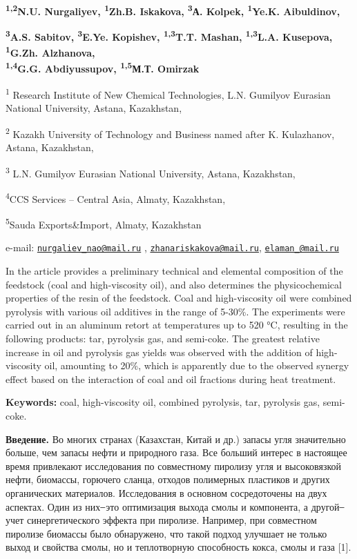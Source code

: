 {\bfseries \textsuperscript{1,2}N.U. Nurgaliyev\textsuperscript{\envelope },
\textsuperscript{1}Zh.B. Iskakova\textsuperscript{\envelope },
\textsuperscript{3}А. Kolpek, \textsuperscript{1}Ye.K.
Aibuldinov\textsuperscript{\envelope },}

{\bfseries \textsuperscript{3}A.S. Sabitov, \textsuperscript{3}E.Ye.
Kopishev, \textsuperscript{1,3}T.T. Mashan, \textsuperscript{1,3}L.A.
Kusepova, \textsuperscript{1}G.Zh. Alzhanova,\\
\textsuperscript{1,4}G.G. Abdiyussupov, \textsuperscript{1,5}М.Т.
Omirzak}

\textsuperscript{1} Research Institute of New Chemical Technologies,
L.N. Gumilyov Eurasian National University, Astana, Kazakhstan,

\textsuperscript{2} Kazakh University of Technology and Business named
after K. Kulazhanov, Astana, Kazakhstan,

\textsuperscript{3} L.N. Gumilyov Eurasian National University, Astana,
Kazakhstan,

\textsuperscript{4}CCS Services -- Central Asia, Almaty, Kazakhstan,

\textsuperscript{5}Sauda Exports\&Import, Almaty, Kazakhstan

e-mail:
\href{mailto:nurgaliev_nao@mail.ru}{\nolinkurl{nurgaliev\_nao@mail.ru}}
,
\href{mailto:zhanariskakova@mail.ru}{\nolinkurl{zhanariskakova@mail.ru}},
\href{mailto:elaman_@mail.ru}{\nolinkurl{elaman\_@mail.ru}}

In the article provides a preliminary technical and elemental
composition of the feedstock (coal and high-viscosity oil), and also
determines the physicochemical properties of the resin of the feedstock.
Coal and high-viscosity oil were combined pyrolysis with various oil
additives in the range of 5-30\%. The experiments were carried out in an
aluminum retort at temperatures up to 520 °C, resulting in the following
products: tar, pyrolysis gas, and semi-coke. The greatest relative
increase in oil and pyrolysis gas yields was observed with the addition
of high-viscosity oil, amounting to 20\%, which is apparently due to the
observed synergy effect based on the interaction of coal and oil
fractions during heat treatment.

{\bfseries Keywords:} coal, high-viscosity oil, combined pyrolysis, tar,
pyrolysis gas, semi-coke.

{\bfseries Введение.} Во многих странах (Казахстан, Китай и др.) запасы
угля значительно больше, чем запасы нефти и природного газа. Все больший
интерес в настоящее время привлекают исследования по совместному
пиролизу угля и высоковязкой нефти, биомассы, горючего сланца, отходов
полимерных пластиков и других органических материалов. Исследования в
основном сосредоточены на двух аспектах. Один из них ̶ это оптимизация
выхода смолы и компонента, а другой ̶ учет синергетического эффекта при
пиролизе. Например, при совместном пиролизе биомассы было обнаружено,
что такой подход улучшает не только выход и свойства смолы, но и
теплотворную способность кокса, смолы и газа {[}1{]}.

